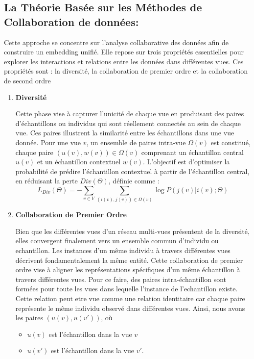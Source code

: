         \subsection{La Théorie Basée sur les Méthodes de Collaboration de données:} 
    
        Cette approche se concentre sur l'analyse collaborative des données afin de construire un embedding unifié. Elle repose sur trois propriétés essentielles pour explorer les interactions et relations entre les données dans différentes vues. Ces propriétés sont : la diversité, la collaboration de premier ordre et la collaboration de second ordre
        \begin{enumerate}
             \item \textbf{Diversité}
             
            Cette phase vise à capturer l'unicité de chaque vue en produisant des paires d'échantillons ou individus qui sont réellement connectés au sein de chaque vue. Ces paires illustrent la similarité entre les échantillons dans une vue donnée. Pour une vue \( v \), un ensemble de paires intra-vue \( \Omega(v) \) est constitué, chaque paire \( (u(v), w(v)) \in \Omega(v) \) comprenant un échantillon central \( u(v) \) et un échantillon contextuel \( w(v) \). L'objectif est d'optimiser la probabilité de prédire l'échantillon contextuel à partir de l'échantillon central, en réduisant la perte \( Div(\Theta) \), définie comme :
                \begin{equation}
                  L_{Div}(\Theta) = -\sum_{v \in V} \sum_{(i(v), j(v)) \in \Omega(v)} \log P(j(v)|i(v); \Theta)
                \end{equation}
            
             \item \textbf {Collaboration de Premier Ordre}

            Bien que les différentes vues d'un réseau multi-vues présentent de la diversité, elles convergent finalement vers un ensemble commun d'individu ou echantillon. Les instances d'un même individu à travers différentes vues décrivent fondamentalement la même entité.       Cette collaboration de premier ordre  vise à aligner les représentations spécifiques d'un même échantillon à travers différentes vues. Pour ce faire, des paires intra-échantillon sont formées pour toute les vues dans lequelle l'instance de l'echantillon existe. Cette relation peut etre vue comme une relation identitaire car chaque paire représente le même individu observé dans différentes vues. Ainsi, nous avons les paires \( (u(v), u(v')) \), où
            \begin{itemize}
                \item  \( u(v) \) est l'échantillon dans la vue \( v \) 
                \item   \( u(v') \) est l'échantillon  dans la vue \( v' \). 
            \end{itemize}
           

\end{enumerate}
